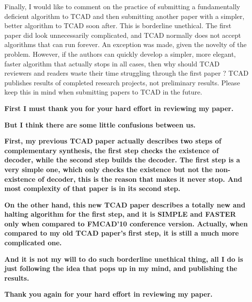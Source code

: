 \documentclass[journal]{IEEEtran}
\begin{document}
Finally, I would like to comment on the practice of submitting a fundamentally deficient algorithm to TCAD and
then submitting another paper with a simpler, better algorithm to TCAD soon after.
This is borderline unethical. The first paper did look unnecessarily complicated,
and TCAD normally does not accept algorithms that can run forever.
An exception was made, given the novelty of the problem. However,
if the authors can quickly develop a simpler, more elegant, faster algorithm that actually stops in all cases,
then why should TCAD reviewers and readers waste their time struggling through the first paper ?
TCAD publishes results of completed research projects, not preliminary results.
Please keep this in mind when submitting papers to TCAD in the future.

\smallskip

\textbf{First I must thank you for your hard effort in reviewing my paper.}

\textbf{But I think there are some little confusions between us.}

\textbf{First, my previous TCAD paper actually describes two steps of
complementary synthesis, the first step checks the existence of
decoder, while the second step builds the decoder. The first step is a
very simple one, which only checks the existence but not the
non-existence of decoder, this is the reason that makes it never stop.
And most complexity of that paper is in its second step.}

\textbf{On the other hand, this new TCAD paper describes a totally new and
halting algorithm for the first step, and it is SIMPLE and FASTER only
when compared to FMCAD'10 conference version.
Actually, when compared to my old TCAD paper's first step, it is still
a much more complicated one.}

\textbf{And it is not my will to do such borderline unethical thing, all I do
is just following the idea that pops up in my mind, and publishing the results.}

\textbf{Thank you again for your hard effort in reviewing my paper.}

\end{document}
